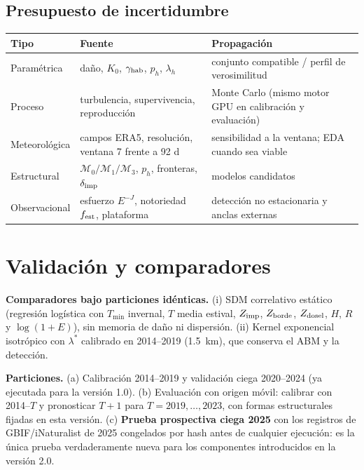 \documentclass[11pt,letterpaper]{article}
\begin{document}
\subsection{Presupuesto de incertidumbre}
\begin{center}\small
\begin{tabularx}{\textwidth}{@{}p{2.3cm}YY@{}}\toprule
Tipo & Fuente & Propagación\\\midrule
Paramétrica & daño, $K_0$, $\gamma_{\rm hab}$, $p_h$, $\lambda_h$ & conjunto compatible / perfil de verosimilitud\\
Proceso & turbulencia, supervivencia, reproducción & Monte Carlo (mismo motor GPU en calibración y evaluación)\\
Meteorológica & campos ERA5, resolución, ventana 7 frente a 92 d & sensibilidad a la ventana; EDA cuando sea viable\\
Estructural & $\mathcal M_0/\mathcal M_1/\mathcal M_3$, $p_h$, fronteras, $\delta_{\rm imp}$ & modelos candidatos\\
Observacional & esfuerzo $E^{-J}$, notoriedad $f_{\rm est}$, plataforma & detección no estacionaria y anclas externas\\
\bottomrule\end{tabularx}\end{center}

\section{Validación y comparadores}
\label{sec:val}
\textbf{Comparadores bajo particiones idénticas.} (i) SDM correlativo estático (regresión logística con $T_{\min}$ invernal, $T$ media estival, $Z_{\rm imp}$, $Z_{\rm borde}$, $Z_{\rm dosel}$, $H$, $R$ y $\log(1+E)$), sin memoria de daño ni dispersión. (ii) Kernel exponencial isotrópico con $\lambda^\ast$ calibrado en 2014--2019 (1.5~km), que conserva el ABM y la detección.

\textbf{Particiones.} (a) Calibración 2014--2019 y validación ciega 2020--2024 (ya ejecutada para la versión 1.0). (b) Evaluación con origen móvil: calibrar con 2014--$T$ y pronosticar $T+1$ para $T=2019,\dots,2023$, con formas estructurales fijadas en esta versión. (c) \textbf{Prueba prospectiva ciega 2025} con los registros de GBIF/iNaturalist de 2025 congelados por hash antes de cualquier ejecución: es la única prueba verdaderamente nueva para los componentes introducidos en la versión 2.0.
\end{document}
